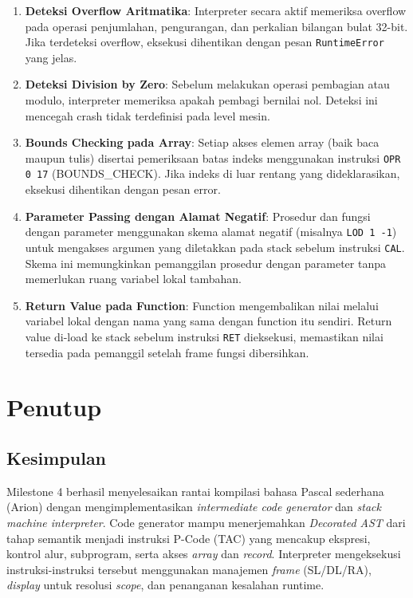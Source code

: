 \documentclass[12pt,a4paper]{article}
\begin{document}
\begin{enumerate}
    \item \textbf{Deteksi Overflow Aritmatika}: Interpreter secara aktif memeriksa overflow pada operasi penjumlahan, pengurangan, dan perkalian bilangan bulat 32-bit. Jika terdeteksi overflow, eksekusi dihentikan dengan pesan \texttt{RuntimeError} yang jelas.
    \item \textbf{Deteksi Division by Zero}: Sebelum melakukan operasi pembagian atau modulo, interpreter memeriksa apakah pembagi bernilai nol. Deteksi ini mencegah crash tidak terdefinisi pada level mesin.
    \item \textbf{Bounds Checking pada Array}: Setiap akses elemen array (baik baca maupun tulis) disertai pemeriksaan batas indeks menggunakan instruksi \texttt{OPR 0 17} (BOUNDS\_CHECK). Jika indeks di luar rentang yang dideklarasikan, eksekusi dihentikan dengan pesan error.
    \item \textbf{Parameter Passing dengan Alamat Negatif}: Prosedur dan fungsi dengan parameter menggunakan skema alamat negatif (misalnya \texttt{LOD 1 -1}) untuk mengakses argumen yang diletakkan pada stack sebelum instruksi \texttt{CAL}. Skema ini memungkinkan pemanggilan prosedur dengan parameter tanpa memerlukan ruang variabel lokal tambahan.
    \item \textbf{Return Value pada Function}: Function mengembalikan nilai melalui variabel lokal dengan nama yang sama dengan function itu sendiri. Return value di-load ke stack sebelum instruksi \texttt{RET} dieksekusi, memastikan nilai tersedia pada pemanggil setelah frame fungsi dibersihkan.
\end{enumerate}



\section{Penutup}
\subsection{Kesimpulan}
Milestone 4 berhasil menyelesaikan rantai kompilasi bahasa Pascal sederhana
(Arion) dengan mengimplementasikan \textit{intermediate code generator} dan
\textit{stack machine interpreter}. Code generator mampu menerjemahkan
\textit{Decorated AST} dari tahap semantik menjadi instruksi P-Code (TAC) yang
mencakup ekspresi, kontrol alur, subprogram, serta akses \textit{array} dan
\textit{record}. Interpreter mengeksekusi instruksi-instruksi tersebut
menggunakan manajemen \textit{frame} (SL/DL/RA), \textit{display} untuk resolusi
\textit{scope}, dan penanganan kesalahan runtime.
\end{document}
